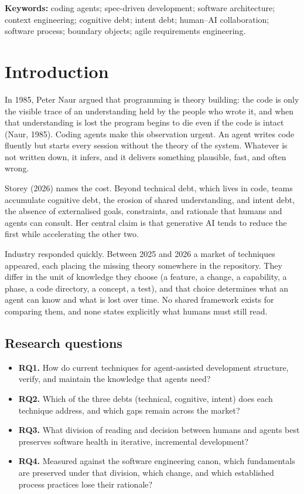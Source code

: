 \documentclass[11pt]{article}
\begin{document}
\noindent\textbf{Keywords:} coding agents; spec-driven development; software architecture; context engineering; cognitive debt; intent debt; human--AI collaboration; software process; boundary objects; agile requirements engineering.

\section{Introduction}

In 1985, Peter Naur argued that programming is theory building: the code is only the visible trace of an understanding held by the people who wrote it, and when that understanding is lost the program begins to die even if the code is intact (Naur, 1985). Coding agents make this observation urgent. An agent writes code fluently but starts every session without the theory of the system. Whatever is not written down, it infers, and it delivers something plausible, fast, and often wrong.

Storey (2026) names the cost. Beyond technical debt, which lives in code, teams accumulate cognitive debt, the erosion of shared understanding, and intent debt, the absence of externalised goals, constraints, and rationale that humans and agents can consult. Her central claim is that generative AI tends to reduce the first while accelerating the other two.

Industry responded quickly. Between 2025 and 2026 a market of techniques appeared, each placing the missing theory somewhere in the repository. They differ in the unit of knowledge they choose (a feature, a change, a capability, a phase, a code directory, a concept, a test), and that choice determines what an agent can know and what is lost over time. No shared framework exists for comparing them, and none states explicitly what humans must still read.

\subsection{Research questions}

\begin{itemize}[leftmargin=*]
  \item \textbf{RQ1.} How do current techniques for agent-assisted development structure, verify, and maintain the knowledge that agents need?
  \item \textbf{RQ2.} Which of the three debts (technical, cognitive, intent) does each technique address, and which gaps remain across the market?
  \item \textbf{RQ3.} What division of reading and decision between humans and agents best preserves software health in iterative, incremental development?
  \item \textbf{RQ4.} Measured against the software engineering canon, which fundamentals are preserved under that division, which change, and which established process practices lose their rationale?
\end{itemize}
\end{document}
